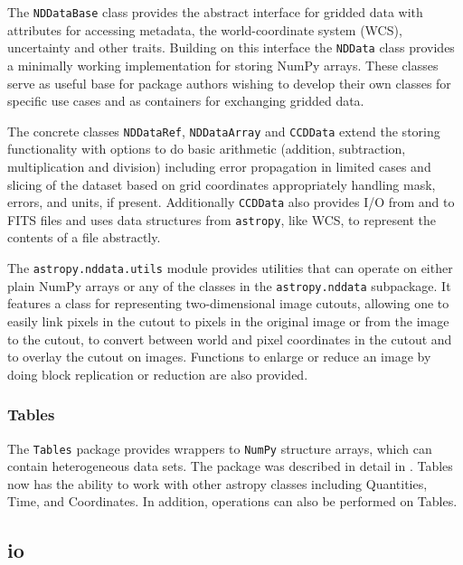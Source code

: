 \documentclass[modern]{aastex61}
\newcommand{\package}[1]{\texttt{#1}\xspace}
\newcommand{\astropypkg}{\package{astropy}}
\begin{document}
The \texttt{NDDataBase} class provides the abstract interface for gridded data with attributes for accessing metadata, the world-coordinate system (WCS), uncertainty and other traits. Building on this interface the \texttt{NDData} class provides a minimally working implementation for storing NumPy arrays. These classes serve as useful base for package authors wishing to develop their own classes for specific use cases and as containers for exchanging gridded data.

The concrete classes \texttt{NDDataRef}, \texttt{NDDataArray} and \texttt{CCDData} extend the storing functionality with options to do basic arithmetic (addition, subtraction, multiplication and division) including error propagation in limited cases and slicing of the dataset based on grid coordinates appropriately handling mask, errors, and units, if present. Additionally \texttt{CCDData} also provides I/O from and to FITS files and uses data structures from \astropypkg, like WCS, to represent the contents of a file abstractly.

The \package{astropy.nddata.utils} module provides utilities that can operate on either plain NumPy arrays or any of the classes in the \package{astropy.nddata} subpackage.  It features a class for representing two-dimensional image cutouts, allowing one to easily link pixels in the cutout to pixels in the original image or from the image to the cutout, to convert between world and pixel coordinates in the cutout and to overlay the cutout on images. Functions to enlarge or reduce an image by doing block replication or reduction are also provided.



\subsubsection{Tables}
\label{sec:table}

The \package{Tables} package provides wrappers to \package{NumPy} structure arrays, which can contain heterogeneous data sets.   The package was described in detail in \cite{astropy}. Tables now has the ability to work with other astropy classes including Quantities, Time, and Coordinates.  In addition, operations can also be performed on Tables.


\subsection{io}
\end{document}
